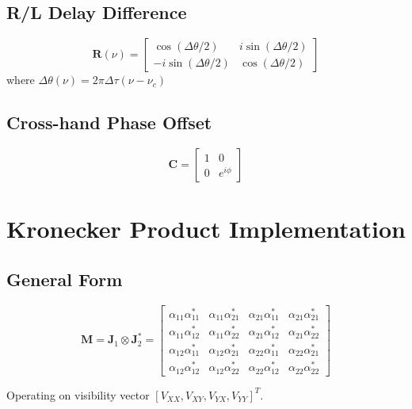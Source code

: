 \documentclass{aastex631}
\begin{document}
\subsection{R/L Delay Difference}
\begin{equation}
\mathbf{R}(\nu) = \begin{bmatrix} 
\cos(\Delta\theta/2) & i\sin(\Delta\theta/2) \\ 
-i\sin(\Delta\theta/2) & \cos(\Delta\theta/2) 
\end{bmatrix}
\end{equation}
where $\Delta\theta(\nu) = 2\pi \Delta\tau (\nu - \nu_c)$

\subsection{Cross-hand Phase Offset}
\begin{equation}
\mathbf{C} = \begin{bmatrix} 1 & 0 \\ 0 & e^{i\phi} \end{bmatrix}
\end{equation}

\section{Kronecker Product Implementation}

\subsection{General Form}
\begin{equation}
\mathbf{M} = \mathbf{J}_1 \otimes \mathbf{J}_2^* = \begin{bmatrix}
\alpha_{11}\alpha_{11}^* & \alpha_{11}\alpha_{21}^* & \alpha_{21}\alpha_{11}^* & \alpha_{21}\alpha_{21}^* \\
\alpha_{11}\alpha_{12}^* & \alpha_{11}\alpha_{22}^* & \alpha_{21}\alpha_{12}^* & \alpha_{21}\alpha_{22}^* \\
\alpha_{12}\alpha_{11}^* & \alpha_{12}\alpha_{21}^* & \alpha_{22}\alpha_{11}^* & \alpha_{22}\alpha_{21}^* \\
\alpha_{12}\alpha_{12}^* & \alpha_{12}\alpha_{22}^* & \alpha_{22}\alpha_{12}^* & \alpha_{22}\alpha_{22}^*
\end{bmatrix}
\end{equation}

Operating on visibility vector $[V_{XX}, V_{XY}, V_{YX}, V_{YY}]^T$.
\end{document}
